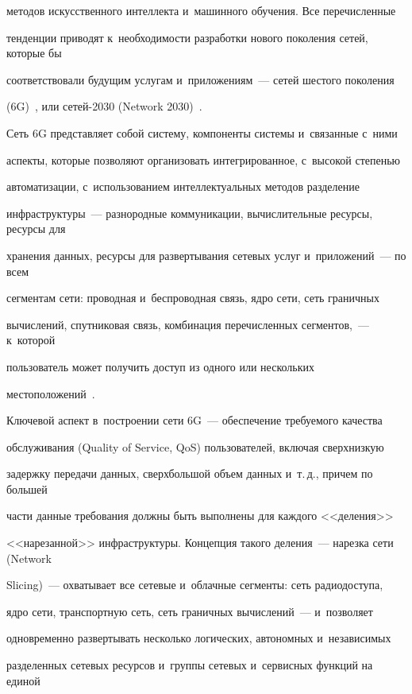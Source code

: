 методов искусственного интеллекта и~машинного обучения. Все перечисленные 


тенденции приводят к~необходимости разработки нового поколения сетей, которые бы 


соответствовали будущим услугам и~приложениям~--- сетей шестого поколения 


(6G)~\cite{ITU}, или се\-тей-2030 (Network 2030)~\cite{3GPP23501}.





Сеть 6G представляет собой систему, компоненты системы и~связанные с~ними 


аспекты, которые позволяют организовать интегрированное, с~высокой степенью 


автоматизации, с~использованием интеллектуальных методов разделение 


инфраструктуры~--- разнородные коммуникации, вычислительные ресурсы, ресурсы для 


хранения данных, ресурсы для развертывания сетевых услуг и~приложений~--- по всем 


сегментам сети: проводная и~беспроводная связь, ядро сети, сеть граничных 


вычислений, спутниковая связь, комбинация перечисленных сегментов,~--- к~которой 


пользователь может получить доступ из одного или нескольких 


местоположений~\cite{Moltchanov2022}.





Ключевой аспект в~построении сети 6G~--- обеспечение требуемого качества 


обслуживания (Quality of Service, QoS) пользователей, включая сверхнизкую 


задержку передачи данных, сверхбольшой объем данных и~т.\,д., причем по большей 


части данные требования должны быть выполнены для каждого <<деления>> 


<<нарезанной>> инфраструктуры. Концепция такого деления~--- нарезка сети (Network 


Slicing)~--- охватывает все сетевые и~облачные сегменты: сеть радиодоступа, 


ядро сети, транспортную сеть, сеть граничных вычислений~--- и~позволяет 


одновременно развертывать несколько логических, автономных и~независимых 


разделенных сетевых ресурсов и~группы сетевых и~сервисных функций на единой 


